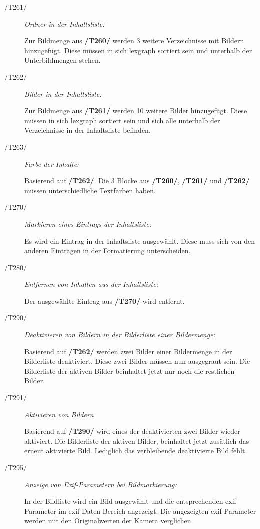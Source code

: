 \begin{description}
			\item[/T261/] \textit{Ordner in der Inhaltsliste:}\par Zur Bildmenge aus \textbf{/T260/} werden 3 weitere Verzeichnisse mit Bildern hinzugefügt. Diese müssen in sich \gls{lexgraph} sortiert sein und unterhalb der Unterbildmengen stehen.
			
			\item[/T262/] \textit{Bilder in der Inhaltsliste:}\par Zur Bildmenge aus \textbf{/T261/} werden 10 weitere Bilder hinzugefügt. Diese müssen in sich \gls{lexgraph} sortiert sein und sich alle unterhalb der Verzeichnisse in der Inhaltsliste befinden.
			
			\item[/T263/] \textit{Farbe der Inhalte:}\par Basierend auf \textbf{/T262/}. Die 3 Blöcke aus \textbf{/T260/}, \textbf{/T261/} und \textbf{/T262/} müssen unterschiedliche Textfarben haben. 
		
			\item[/T270/] \textit{Markieren eines Eintrags der Inhaltsliste:}\par Es wird ein Eintrag in der Inhaltsliste ausgewählt. Diese muss sich von den anderen Einträgen in der Formatierung unterscheiden.
		
			\item[/T280/] \textit{Entfernen von Inhalten aus der Inhaltsliste:}\par Der ausgewählte Eintrag aus \textbf{/T270/} wird entfernt.
		
			\item[/T290/] \textit{Deaktivieren von Bildern in der Bilderliste einer Bildermenge:}\par Basierend auf \textbf{/T262/} werden zwei Bilder einer Bildermenge in der Bilderliste deaktiviert. Diese zwei Bilder müssen nun ausgegraut sein. Die Bilderliste der aktiven Bilder beinhaltet jetzt nur noch die restlichen Bilder.
			
			\item[/T291/] \textit{Aktivieren von Bildern}\par Basierend auf \textbf{/T290/} wird eines der deaktivierten zwei Bilder wieder aktiviert. Die Bilderliste der aktiven Bilder, beinhaltet jetzt zusätlich das erneut aktivierte Bild. Lediglich das verbleibende deaktivierte Bild fehlt.
			
			\item[/T295/] \textit{Anzeige von Exif-Parametern bei Bildmarkierung:}\par In der Bildliste wird ein Bild ausgewählt und die entsprechenden \gls{exif}-Parameter im \gls{exif}-Daten Bereich angezeigt. Die angezeigten \gls{exif}-Parameter werden mit den Originalwerten der Kamera verglichen.
			
		\end{description}
	
